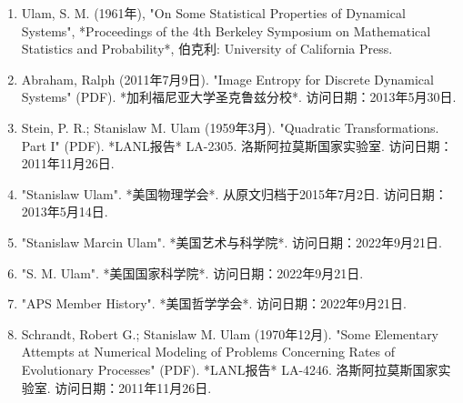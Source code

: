 \begin{enumerate}
\item Ulam, S. M. (1961年), "On Some Statistical Properties of Dynamical Systems", *Proceedings of the 4th Berkeley Symposium on Mathematical Statistics and Probability*, 伯克利: University of California Press.
\item Abraham, Ralph (2011年7月9日). "Image Entropy for Discrete Dynamical Systems" (PDF). *加利福尼亚大学圣克鲁兹分校*. 访问日期：2013年5月30日.
\item Stein, P. R.; Stanislaw M. Ulam (1959年3月). "Quadratic Transformations. Part I" (PDF). *LANL报告* LA-2305. 洛斯阿拉莫斯国家实验室. 访问日期：2011年11月26日.
\item "Stanislaw Ulam". *美国物理学会*. 从原文归档于2015年7月2日. 访问日期：2013年5月14日.
\item "Stanislaw Marcin Ulam". *美国艺术与科学院*. 访问日期：2022年9月21日.
\item "S. M. Ulam". *美国国家科学院*. 访问日期：2022年9月21日.
\item "APS Member History". *美国哲学学会*. 访问日期：2022年9月21日.
\item Schrandt, Robert G.; Stanislaw M. Ulam (1970年12月). "Some Elementary Attempts at Numerical Modeling of Problems Concerning Rates of Evolutionary Processes" (PDF). *LANL报告* LA-4246. 洛斯阿拉莫斯国家实验室. 访问日期：2011年11月26日.
\end{enumerate}